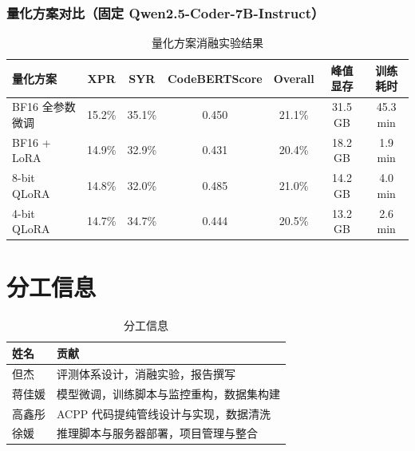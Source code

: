 \documentclass[a4paper]{article}
\begin{document}
\FloatBarrier

\subsubsection{量化方案对比（固定 Qwen2.5-Coder-7B-Instruct）}

\begin{table}[htbp]
\centering
\begin{tabularx}{\textwidth}{Xcccccc}
\toprule
\textbf{量化方案} & \textbf{XPR} & \textbf{SYR} & \textbf{CodeBERTScore} & \textbf{Overall} & \textbf{峰值显存} & \textbf{训练耗时} \\
\midrule
BF16 全参数微调 & 15.2\% & 35.1\% & 0.450 & 21.1\% & 31.5 GB & 45.3 min \\
BF16 + LoRA & 14.9\% & 32.9\% & 0.431 & 20.4\% & 18.2 GB & 1.9 min \\
8-bit QLoRA & 14.8\% & 32.0\% & 0.485 & 21.0\% & 14.2 GB & 4.0 min \\
4-bit QLoRA & 14.7\% & 34.7\% & 0.444 & 20.5\% & 13.2 GB & 2.6 min \\
\bottomrule
\end{tabularx}
\caption{量化方案消融实验结果}
\end{table}

\section{分工信息}
\begin{table}[h!]
\centering
\begin{tabularx}{\textwidth}{lX}
\toprule
\textbf{姓名} & \textbf{贡献} \\
\midrule
但杰 & 评测体系设计，消融实验，报告撰写 \\
蒋佳媛 & 模型微调，训练脚本与监控重构，数据集构建 \\
高鑫彤 & ACPP 代码提纯管线设计与实现，数据清洗 \\
徐媛 & 推理脚本与服务器部署，项目管理与整合 \\
\bottomrule
\end{tabularx}
\caption{分工信息}
\end{table}
\end{document}
